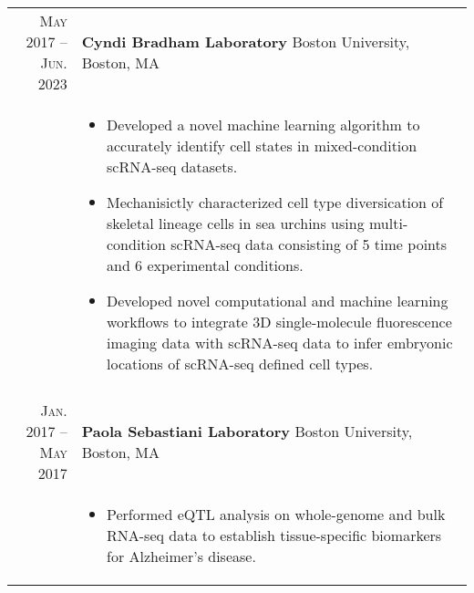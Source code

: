 \documentclass[a4paper,10pt]{report}
\begin{document}
\section{\color{linkcolour}{Research}}
\begin{longtable}{r|p{10cm}}
	\textsc{May 2017 -- Jun. 2023}   & \textbf{Cyndi Bradham Laboratory} Boston University, Boston, MA    \\
	                                 & \footnotesize{
		\vspace{-3.5mm}
		\begin{itemize}
			\setlength\itemsep{0em}
			\item Developed a novel machine learning algorithm to accurately identify cell states in mixed-condition scRNA-seq datasets.
			\item Mechanisictly characterized cell type diversication of skeletal lineage cells in sea urchins using multi-condition scRNA-seq data consisting of 5 time points and 6 experimental conditions.
			\item Developed novel computational and machine learning workflows to integrate 3D single-molecule fluorescence imaging data with scRNA-seq data to infer embryonic locations of scRNA-seq defined cell types.
		\end{itemize}
	} \vspace{-3.5mm}                                                                                     \\
	\multicolumn{2}{c}{}                                                                                  \\[-0.75em]
	\textsc{Jan. 2017 -- May 2017}   & \textbf{Paola Sebastiani Laboratory} Boston University, Boston, MA \\
	                                 & \footnotesize{
		\vspace{-3.5mm}
		\begin{itemize}
			\setlength\itemsep{0em}
			\item Performed eQTL analysis on whole-genome and bulk RNA-seq data to establish tissue-specific biomarkers for Alzheimer's disease.
		\end{itemize}
	} \vspace{-3.5mm}                                                                                     \\

\end{longtable}
\end{document}

